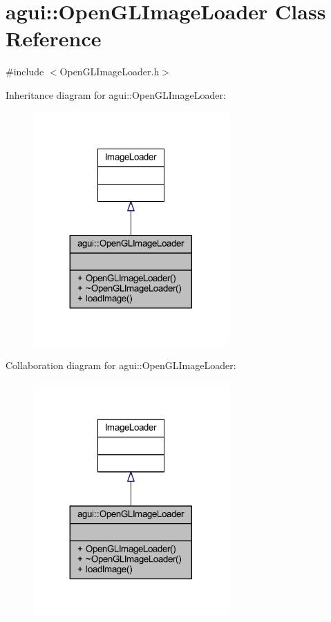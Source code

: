 \hypertarget{classagui_1_1_open_g_l_image_loader}{}\section{agui\+:\+:Open\+G\+L\+Image\+Loader Class Reference}
\label{classagui_1_1_open_g_l_image_loader}


{\ttfamily \#include $<$Open\+G\+L\+Image\+Loader.\+h$>$}



Inheritance diagram for agui\+:\+:Open\+G\+L\+Image\+Loader\+:\nopagebreak
\begin{figure}[H]
\begin{center}
\leavevmode
\includegraphics[width=212pt]{classagui_1_1_open_g_l_image_loader__inherit__graph}
\end{center}
\end{figure}


Collaboration diagram for agui\+:\+:Open\+G\+L\+Image\+Loader\+:\nopagebreak
\begin{figure}[H]
\begin{center}
\leavevmode
\includegraphics[width=212pt]{classagui_1_1_open_g_l_image_loader__coll__graph}
\end{center}
\end{figure}
